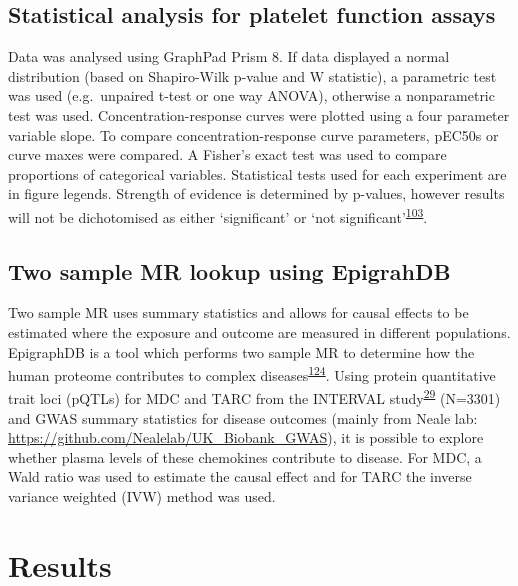 \documentclass[11pt,twoside]{bristolthesis}
\begin{document}
\hypertarget{statistical-analysis-for-platelet-function-assays-1}{%
\subsection{Statistical analysis for platelet function assays}\label{statistical-analysis-for-platelet-function-assays-1}}

Data was analysed using GraphPad Prism 8. If data displayed a normal distribution (based on Shapiro-Wilk p-value and W statistic), a parametric test was used (e.g.~unpaired t-test or one way ANOVA), otherwise a nonparametric test was used. Concentration-response curves were plotted using a four parameter variable slope. To compare concentration-response curve parameters, pEC50s or curve maxes were compared. A Fisher's exact test was used to compare proportions of categorical variables. Statistical tests used for each experiment are in figure legends. Strength of evidence is determined by p-values, however results will not be dichotomised as either `significant' or `not significant'\textsuperscript{\protect\hyperlink{ref-Sterne2001}{103}}.

\hypertarget{two-sample-mr-lookup-using-epigrahdb}{%
\subsection{Two sample MR lookup using EpigrahDB}\label{two-sample-mr-lookup-using-epigrahdb}}

Two sample MR uses summary statistics and allows for causal effects to be estimated where the exposure and outcome are measured in different populations. EpigraphDB is a tool which performs two sample MR to determine how the human proteome contributes to complex diseases\textsuperscript{\protect\hyperlink{ref-Zheng2020}{124}}. Using protein quantitative trait loci (pQTLs) for MDC and TARC from the INTERVAL study\textsuperscript{\protect\hyperlink{ref-Sun2018}{29}} (N=3301) and GWAS summary statistics for disease outcomes (mainly from Neale lab: \url{https://github.com/Nealelab/UK_Biobank_GWAS}), it is possible to explore whether plasma levels of these chemokines contribute to disease. For MDC, a Wald ratio was used to estimate the causal effect and for TARC the inverse variance weighted (IVW) method was used.

\hypertarget{results-2}{%
\section{Results}\label{results-2}}
\end{document}
